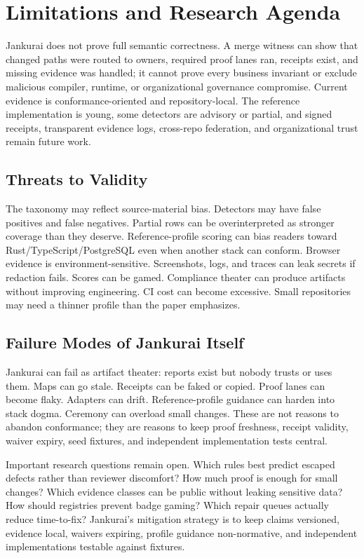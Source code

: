 \section{Limitations and Research Agenda}

Jankurai does not prove full semantic correctness. A merge witness can show that changed paths were routed to owners, required proof lanes ran, receipts exist, and missing evidence was handled; it cannot prove every business invariant or exclude malicious compiler, runtime, or organizational governance compromise. Current evidence is conformance-oriented and repository-local. The reference implementation is young, some detectors are advisory or partial, and signed receipts, transparent evidence logs, cross-repo federation, and organizational trust remain future work.

\subsection{Threats to Validity}

The taxonomy may reflect source-material bias. Detectors may have false positives and false negatives. Partial rows can be overinterpreted as stronger coverage than they deserve. Reference-profile scoring can bias readers toward Rust/TypeScript/PostgreSQL even when another stack can conform. Browser evidence is environment-sensitive. Screenshots, logs, and traces can leak secrets if redaction fails. Scores can be gamed. Compliance theater can produce artifacts without improving engineering. CI cost can become excessive. Small repositories may need a thinner profile than the paper emphasizes.

\subsection{Failure Modes of Jankurai Itself}

Jankurai can fail as artifact theater: reports exist but nobody trusts or uses them. Maps can go stale. Receipts can be faked or copied. Proof lanes can become flaky. Adapters can drift. Reference-profile guidance can harden into stack dogma. Ceremony can overload small changes. These are not reasons to abandon conformance; they are reasons to keep proof freshness, receipt validity, waiver expiry, seed fixtures, and independent implementation tests central.

Important research questions remain open. Which rules best predict escaped defects rather than reviewer discomfort? How much proof is enough for small changes? Which evidence classes can be public without leaking sensitive data? How should registries prevent badge gaming? Which repair queues actually reduce time-to-fix? Jankurai's mitigation strategy is to keep claims versioned, evidence local, waivers expiring, profile guidance non-normative, and independent implementations testable against fixtures.

